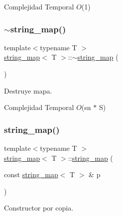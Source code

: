 \begin{DoxyDescription}
\item[Complejidad Temporal]$O$(1)
\end{DoxyDescription}\mbox{\label{classstring__map_a37b201370c0a6a3c2aa488dedbc0a9d7}} 
\subsubsection{\texorpdfstring{$\sim$string\+\_\+map()}{~string\_map()}}
{\footnotesize\ttfamily template$<$typename T $>$ \\
\mbox{\hyperlink{classstring__map}{string\+\_\+map}}$<$ T $>$\+::$\sim$\mbox{\hyperlink{classstring__map}{string\+\_\+map}} (\begin{DoxyParamCaption}{ }\end{DoxyParamCaption})}



Destruye mapa. 


\begin{DoxyDescription}
\item[Complejidad Temporal]$O$(sn $\ast$ S)
\end{DoxyDescription}\mbox{\label{classstring__map_a699366edd8a6d33bdc7977a42038822b}} 
\subsubsection{\texorpdfstring{string\+\_\+map()}{string\_map()}\hspace{0.1cm}{\footnotesize\ttfamily [2/2]}}
{\footnotesize\ttfamily template$<$typename T $>$ \\
\mbox{\hyperlink{classstring__map}{string\+\_\+map}}$<$ T $>$\+::\mbox{\hyperlink{classstring__map}{string\+\_\+map}} (\begin{DoxyParamCaption}\item[{const \mbox{\hyperlink{classstring__map}{string\+\_\+map}}$<$ T $>$ \&}]{p }\end{DoxyParamCaption})}



Constructor por copia. 

